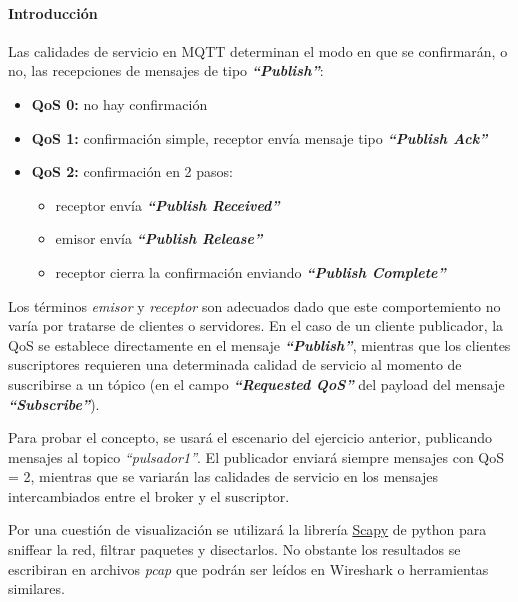 \documentclass[11pt]{article}
\begin{document}
    \hypertarget{introducciuxf3n}{%
\paragraph{Introducción}\label{introducciuxf3n}}

Las calidades de servicio en MQTT determinan el modo en que se
confirmarán, o no, las recepciones de mensajes de tipo
\textbf{\emph{``Publish''}}:

\begin{itemize}
\item
  \textbf{QoS 0:} no hay confirmación
\item
  \textbf{QoS 1:} confirmación simple, receptor envía mensaje tipo
  \textbf{\emph{``Publish Ack''}}
\item
  \textbf{QoS 2:} confirmación en 2 pasos:

  \begin{itemize}
  \item
    receptor envía \textbf{\emph{``Publish Received''}}
  \item
    emisor envía \textbf{\emph{``Publish Release''}}
  \item
    receptor cierra la confirmación enviando \textbf{\emph{``Publish
    Complete''}}
  \end{itemize}
\end{itemize}

Los términos \emph{emisor} y \emph{receptor} son adecuados dado que este
comportemiento no varía por tratarse de clientes o servidores. En el
caso de un cliente publicador, la QoS se establece directamente en el
mensaje \textbf{\emph{``Publish''}}, mientras que los clientes
suscriptores requieren una determinada calidad de servicio al momento de
suscribirse a un tópico (en el campo \textbf{\emph{``Requested QoS''}}
del payload del mensaje \textbf{\emph{``Subscribe''}}).

Para probar el concepto, se usará el escenario del ejercicio anterior,
publicando mensajes al topico \emph{``pulsador1''}. El publicador
enviará siempre mensajes con QoS = 2, mientras que se variarán las
calidades de servicio en los mensajes intercambiados entre el broker y
el suscriptor.

Por una cuestión de visualización se utilizará la librería
\href{https://scapy.net/}{Scapy} de python para sniffear la red, filtrar
paquetes y disectarlos. No obstante los resultados se escribiran en
archivos \emph{pcap} que podrán ser leídos en Wireshark o herramientas
similares.
\end{document}
